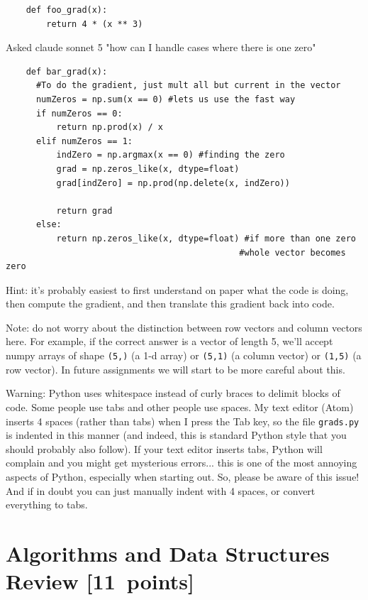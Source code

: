 \documentclass{article}
\newcommand\pts[1]{\textcolor{pointscolour}{[#1~points]}}
\begin{document}
  \begin{lstlisting}
    def foo_grad(x):
        return 4 * (x ** 3)
  \end{lstlisting}

  Asked claude sonnet 5 "how can I handle cases where there is one zero"
  \begin{lstlisting}
    def bar_grad(x):
      #To do the gradient, just mult all but current in the vector
      numZeros = np.sum(x == 0) #lets us use the fast way
      if numZeros == 0:
          return np.prod(x) / x
      elif numZeros == 1: 
          indZero = np.argmax(x == 0) #finding the zero
          grad = np.zeros_like(x, dtype=float) 
          grad[indZero] = np.prod(np.delete(x, indZero)) 
          
          return grad
      else:
          return np.zeros_like(x, dtype=float) #if more than one zero 
                                              #whole vector becomes zero
  \end{lstlisting}
  Hint: it's probably easiest to first understand on paper what the code is doing, then compute
  the gradient, and then translate this gradient back into code.

  Note: do not worry about the distinction between row vectors and column vectors here.
  For example, if the correct answer is a vector of length 5, we'll accept numpy arrays
  of shape \texttt{(5,)} (a 1-d array) or \texttt{(5,1)} (a column vector) or
  \texttt{(1,5)} (a row vector). In future assignments we will start to be more careful
  about this.

  Warning: Python uses whitespace instead of curly braces to delimit blocks of code.
  Some people use tabs and other people use spaces. My text editor (Atom) inserts 4 spaces (rather than tabs) when
  I press the Tab key, so the file \texttt{grads.py} is indented in this manner (and indeed, this is standard Python style that you should probably also follow). If your text editor inserts tabs,
  Python will complain and you might get mysterious errors... this is one of the most annoying aspects
  of Python, especially when starting out. So, please be aware of this issue! And if in doubt you can just manually
  indent with 4 spaces, or convert everything to tabs.


  \clearpage\section{Algorithms and Data Structures Review \pts{11}}
\end{document}
